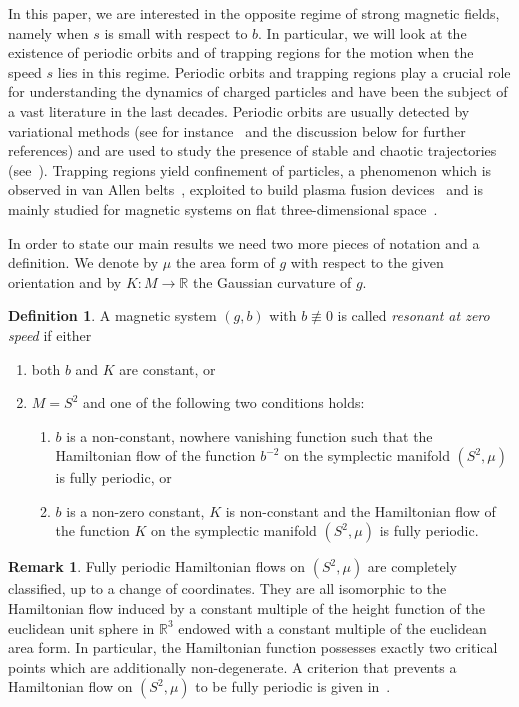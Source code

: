 \documentclass[10pt]{amsart}
\theoremstyle{definition}
\newtheorem{rema}[cdrthm]{Remark}
\newtheorem{defi}[cdrthm]{Definition}
\newcommand{\R}{\mathbb{R}}
\begin{document}
In this paper, we are interested in the opposite regime of strong magnetic fields, namely when $s$ is small with respect to $b$. In particular, we will look at the existence of periodic orbits and of trapping regions for the motion when the speed $s$ lies in this regime. Periodic orbits and trapping regions play a crucial role for understanding the dynamics of charged particles and have been the subject of a vast literature in the last decades. Periodic orbits are usually detected by variational methods (see for instance~\cite{Benedetti:2016b,Ginzburg:1994,Taimanov:1992fs} and the discussion below for further references) and are used to study the presence of stable and chaotic trajectories (see~\cite{Abreu:2017,Miranda:2007}). Trapping regions yield confinement of particles, a phenomenon which is observed in van Allen belts~\cite{Braun}, exploited to build plasma fusion devices~\cite{HM} and is mainly studied for magnetic systems on flat three-dimensional space~\cite{Peralta,Truc}.

In order to state our main results we need two more pieces of notation and a definition. We denote by $\mu$ the area form of $g$ with respect to the given orientation and by $K:M\to\R$ the Gaussian curvature of $g$.

\begin{defi}\label{d:non}
A magnetic system $(g,b)$ with $b\not\equiv 0$ is called \emph{resonant at zero speed} if either
\begin{enumerate}
\item\label{defi1.1.1} both $b$ and $K$ are constant, or
\item\label{defi1.1.2} $M=S^2$ and one of the following two conditions holds:
\begin{enumerate}
\item\label{defi1.1.2.a} $b$ is a non-constant, nowhere vanishing function such that the Hamiltonian flow of the function $b^{-2}$ on the symplectic manifold $(S^2,\mu)$ is fully periodic, or
\item\label{defi1.1.2.b} $b$ is a non-zero constant, $K$ is non-constant and the Hamiltonian flow of the function $K$ on the symplectic manifold $(S^2,\mu)$ is fully periodic.
\end{enumerate}
\end{enumerate}
\end{defi}

\begin{rema}
Fully periodic Hamiltonian flows on $(S^2,\mu)$ are completely classified, up to a change of coordinates. They are all isomorphic to the Hamiltonian flow induced by a constant multiple of the height function of the euclidean unit sphere in $\R^3$ endowed with a constant multiple of the euclidean area form. In particular, the Hamiltonian function possesses exactly two critical points which are additionally non-degenerate. A criterion that prevents a Hamiltonian flow on $(S^2,\mu)$ to be fully periodic is given in~\cite[Theorem~1.7]{AB21}.
\end{rema}
\end{document}
